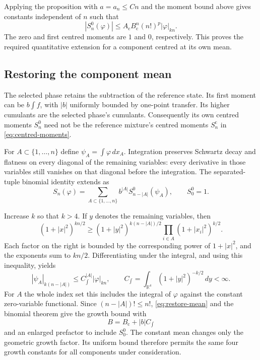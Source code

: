 \documentclass[11pt,letterpaper,reqno]{amsart}
\theoremstyle{definition}
\theoremstyle{remark}
\newcommand{\R}{\mathbb R}
\begin{document}
Applying the proposition with $a=a_n\le Cn$ and the moment bound
above gives constants independent of $n$ such that
\[
 |S_n^0(\varphi)|\le A_{\mathrm c}B_{\mathrm c}^n(n!)^p
                                  |\varphi|_{kn}.
\]
The zero and first centred moments are $1$ and $0$, respectively.
This proves the required quantitative extension for a component
centred at its own mean.

\subsection{Restoring the component mean}

The selected phase retains the subtraction of
the reference state. Its first moment can be $b\int f$, with $|b|$
uniformly bounded by one-point transfer. Its higher cumulants are the
selected phase's cumulants. Consequently its own centred moments
$S_n^0$ need not be the reference mixture's centred moments
$S_n^{\mathrm c}$ in \eqref{eq:centred-moments}.

For $A\subset\{1,\ldots,n\}$ define
$\psi_A=\int\varphi\,dx_A$. Integration preserves Schwartz decay
and flatness on every diagonal of the remaining variables: every
derivative in those variables still vanishes on that diagonal before
the integration. The separated-tuple binomial identity extends as
\begin{equation}\label{eq:restore-mean}
 S_n(\varphi)
       =\sum_{A\subset\{1,\ldots,n\}}
                    b^{|A|}S_{n-|A|}^0(\psi_A),\qquad S_0^0=1.
\end{equation}

Increase $k$ so that $k>4$. If $y$ denotes the remaining variables,
then
\[
 (1+|x|^2)^{kn/2}
  \ge (1+|y|^2)^{k(n-|A|)/2}
                         \prod_{i\in A}(1+|x_i|^2)^{k/2}.
\]
Each factor on the right is bounded by the corresponding power of
$1+|x|^2$, and the exponents sum to $kn/2$. Differentiating under
the integral, and using this inequality, yields
\[
 |\psi_A|_{k(n-|A|)}
       \le C_{\int}^{|A|}|\varphi|_{kn},
 \qquad C_{\int}=\int_{\R^4}(1+|y|^2)^{-k/2}\,dy<\infty.
\]
For $A$ the whole index set this includes the integral of $\varphi$
against the constant zero-variable functional. Since
$(n-|A|)!\le n!$, \eqref{eq:restore-mean} and the binomial theorem
give the growth bound with
\[
 B=B_{\mathrm c}+|b|C_{\int}
\]
and an enlarged prefactor to include $S_0^0$. The constant mean changes
only the geometric growth factor. Its uniform bound therefore permits
the same four growth constants for all components under consideration.
\end{document}
